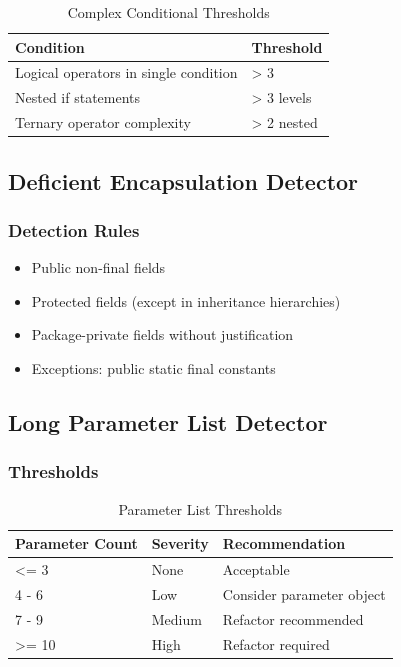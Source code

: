 \documentclass[12pt,a4paper]{article}
\begin{document}
    \begin{table}[H]
        \caption{Complex Conditional Thresholds}
        \begin{tabular}{|l|l|}
            \hline
            \textbf{Condition} & \textbf{Threshold} \\
            \hline
            Logical operators in single condition & > 3 \\
            \hline
            Nested if statements & > 3 levels \\
            \hline
            Ternary operator complexity & > 2 nested \\
            \hline
        \end{tabular}
    \end{table}

    \subsection{Deficient Encapsulation Detector}

    \subsubsection{Detection Rules}

    \begin{itemize}[leftmargin=0.5in]
        \item Public non-final fields
        \item Protected fields (except in inheritance hierarchies)
        \item Package-private fields without justification
        \item Exceptions: public static final constants
    \end{itemize}

    \subsection{Long Parameter List Detector}

    \subsubsection{Thresholds}

    \begin{table}[H]
        \caption{Parameter List Thresholds}
        \begin{tabular}{|l|l|l|}
            \hline
            \textbf{Parameter Count} & \textbf{Severity} & \textbf{Recommendation} \\
            \hline
            <= 3 & None & Acceptable \\
            \hline
            4 - 6 & Low & Consider parameter object \\
            \hline
            7 - 9 & Medium & Refactor recommended \\
            \hline
            >= 10 & High & Refactor required \\
            \hline
        \end{tabular}
    \end{table}
\end{document}
